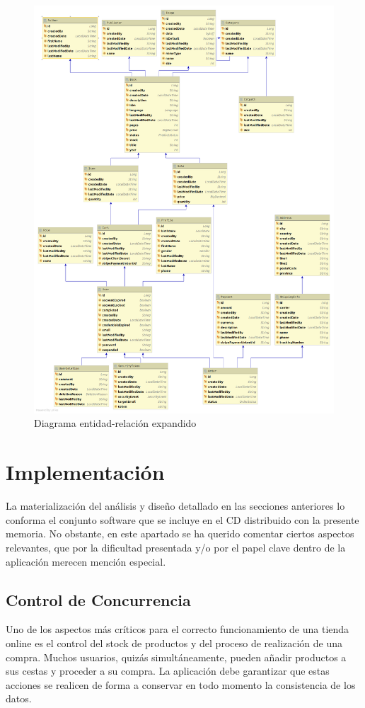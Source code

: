 \documentclass[a4paper]{article}
\begin{document}
	\begin{figure}[htb!]
		\centering
		\includegraphics[width=\textwidth,keepaspectratio]{er_expanded_diagram}
		\caption{Diagrama entidad-relación expandido}
		\label{fig:er_expanded_diagram}
	\end{figure}

    \section{Implementación}
    La materialización del análisis y diseño detallado en las secciones anteriores lo conforma el conjunto software que se incluye en el CD distribuido con la presente memoria. No obstante, en este apartado se ha querido comentar ciertos aspectos relevantes, que por la dificultad presentada y/o por el papel clave dentro de la aplicación merecen mención especial.
    
    \subsection{Control de Concurrencia}
    Uno de los aspectos más críticos para el correcto funcionamiento de una tienda online es el control del stock de productos y del proceso de realización de una compra. Muchos usuarios, quizás simultáneamente, pueden añadir productos a sus cestas y proceder a su compra. La aplicación debe garantizar que estas acciones se realicen de forma a conservar en todo momento la consistencia de los datos.
    
\end{document}
